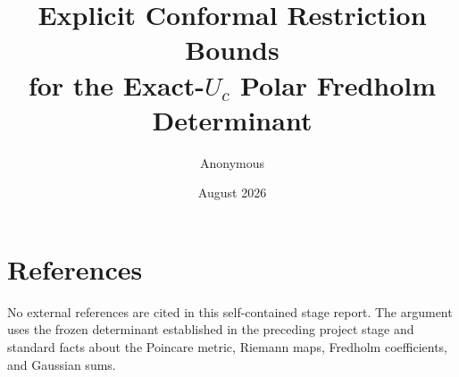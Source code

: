 \documentclass[11pt]{article}
\title{Explicit Conformal Restriction Bounds\\
for the Exact-\(U_c\) Polar Fredholm Determinant}
\author{Anonymous}
\date{August 2026}
\begin{document}
\maketitle
\begin{abstract}

\end{abstract}





\appendix

\section*{References}
No external references are cited in this self-contained stage report.  The
argument uses the frozen determinant established in the preceding project
stage and standard facts about the Poincare metric, Riemann maps, Fredholm
coefficients, and Gaussian sums.
\end{document}
